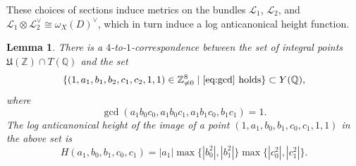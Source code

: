 \documentclass[a4paper, twoside, 10pt]{amsart}
\newcommand{\cL}{\mathcal{L}}
\newcommand{\mU}{\mathfrak{U}}
\newcommand{\ZZ}{\mathbb{Z}}
\newcommand{\ZZnz}{\mathbb{Z}_{\neq{}0}}
\newcommand{\QQ}{\mathbb{Q}}
\newcommand{\abs}[1]{\left\lvert#1\right\rvert}
\newtheorem{lemma}[theorem]{Lemma}
\theoremstyle{definition}
\begin{document}
These choices of sections induce metrics on the bundles $\cL_1$, $\cL_2$, and $\cL_1\otimes \cL_2^\vee \cong \omega_X(D)^\vee$, which in turn induce a log anticanonical height function.

\begin{lemma}\label{lem:4-to-1-and-height}
  There is a $4$-to-$1$-correspondence between the set of integral points $\mU(\ZZ)\cap T(\QQ)$ and the set
  \begin{equation*}
  \{(1,a_1,b_1,b_2,c_1,c_2,1,1)\in\ZZnz^8 \mid \text{\eqref{eq:gcd} holds} \} \subset Y(\QQ),
  \end{equation*}
  where 
  \begin{equation}\label{eq:gcd}
    \gcd(a_1b_0c_0,a_1b_0c_1,a_1b_1c_0,b_1c_1)=1.
  \end{equation}
  The log anticanonical height of the image of a point $(1,a_1,b_0,b_1,c_0,c_1,1,1)$ in the above set is
  \begin{equation}\label{eq:height}
    H(a_1,b_0,b_1,c_0,c_1)=\abs{a_1} \max\{\abs{b_0^2},\abs{b_1^2}\} \max\{\abs{c_0^2},\abs{c_1^2}\}\text{.}
  \end{equation}
\end{lemma}
\end{document}
